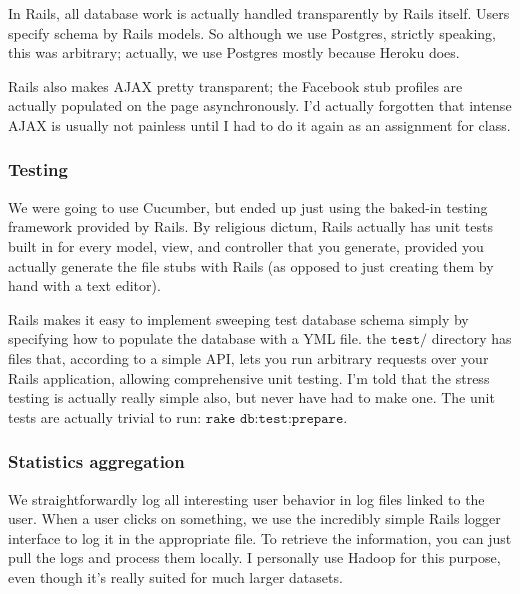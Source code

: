 \documentclass[11pt,a4paper]{article}
\begin{document}
In Rails, all database work is actually handled transparently by Rails itself. Users specify schema by Rails models. So although we use Postgres, strictly speaking, this was arbitrary; actually, we use Postgres mostly because Heroku does.

Rails also makes AJAX pretty transparent; the Facebook stub profiles are actually populated on the page asynchronously. I'd actually forgotten that intense AJAX is usually not painless until I had to do it again as an assignment for class.

\subsubsection{Testing}

We were going to use Cucumber, but ended up just using the baked-in testing framework provided by Rails. By religious dictum, Rails actually has unit tests built in for every model, view, and controller that you generate, provided you actually generate the file stubs with Rails (as opposed to just creating them by hand with a text editor).

Rails makes it easy to implement sweeping test database schema simply by specifying how to populate the database with a YML file. the $\texttt{test/}$ directory has files that, according to a simple API, lets you run arbitrary requests over your Rails application, allowing comprehensive unit testing. I'm told that the stress testing is actually really simple also, but never have had to make one. The unit tests are actually trivial to run: $\texttt{rake db:test:prepare}$.

\subsubsection{Statistics aggregation}

We straightforwardly log all interesting user behavior in log files linked to the user. When a user clicks on something, we use the incredibly simple Rails logger interface to log it in the appropriate file. To retrieve the information, you can just pull the logs and process them locally. I personally use Hadoop for this purpose, even though it's really suited for much larger datasets.
\end{document}
